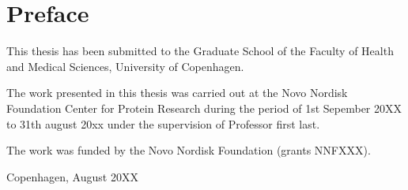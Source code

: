 \chapter*{\vspace{-5em}Preface}
\label{ch:preface}
\vspace{-8em}
This thesis has been submitted to the Graduate School of the Faculty of Health and Medical Sciences, University of Copenhagen. 

The work presented in this thesis was carried out at the Novo Nordisk Foundation Center for Protein Research during the period of 1st Sepember 20XX to 31th august 20xx under the supervision of Professor first last.

The work was funded by the Novo Nordisk Foundation (grants NNFXXX).


\begin{flushright}
	
	Copenhagen, August 20XX
	
	\vspace{1em}
	\thesisName
	
\end{flushright}